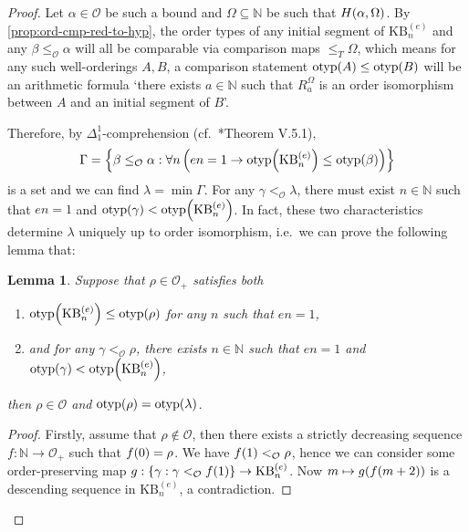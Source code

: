 \documentclass[12pt,openany]{book}
\theoremstyle{plain}
\newtheorem*{lemma*}{Lemma}
\theoremstyle{definition}
\newcommand\uplabel[1]{\textup{(#1)}}
\newcommand\opA[1]{\mathop{\forall #1}}
\DeclareMathOperator\otyp{otyp}
\newcommand\KB{\mathrm{KB}}
\begin{document}
\begin{proof}
  Let $\alpha \in \mathcal{O}$ be such a bound and $\Omega \subseteq \mathbb{N}$ be such that $H\mleft(\alpha, \Omega\mright)$. By \autoref{prop:ord-cmp-red-to-hyp}, the order types of any initial segment of $\KB^{(e)}_n$ and any $\beta \leq_\mathcal{O} \alpha$ will all be comparable via comparison maps $\leq_T \Omega$, which means for any such well-orderings $A, B$, a comparison statement $\otyp\mleft(A\mright) \leq \otyp\mleft(B\mright)$ will be an arithmetic formula `there exists $a \in \mathbb{N}$ such that $R^\Omega_a$ is an order isomorphism between $A$ and an initial segment of $B$'.

  Therefore, by $\Delta^1_1$-comprehension (cf.\ \cite{simpson09-soa}*{Theorem V.5.1}),
  \[\Gamma = \left\{\beta \leq_\mathcal{O} \alpha : \opA{n} \left(en = 1 \rightarrow \otyp\mleft(\KB^{(e)}_n\mright) \leq \otyp\mleft(\beta\mright)\right)\right\}\]
  is a set and we can find $\lambda = \min \Gamma$. For any $\gamma <_\mathcal{O} \lambda$, there must exist $n \in \mathbb{N}$ such that $en = 1$ and $\otyp\mleft(\gamma\mright) < \otyp\mleft(\KB^{(e)}_n\mright)$. In fact, these two characteristics determine $\lambda$ uniquely up to order isomorphism, i.e.\ we can prove the following lemma that:
  \begin{lemma*}
    Suppose that $\rho \in \mathcal{O}_+$ satisfies both
    \begin{enumerate}[label=\uplabel{\roman*}]
      \item $\otyp\mleft(\KB^{(e)}_n\mright) \leq \otyp\mleft(\rho\mright)$ for any $n$ such that $en = 1$,
      \item and for any $\gamma <_\mathcal{O} \rho$, there exists $n \in \mathbb{N}$ such that $en = 1$ and $\otyp\mleft(\gamma\mright) < \otyp\mleft(\KB^{(e)}_n\mright)$,
    \end{enumerate}
    then $\rho \in \mathcal{O}$ and $\otyp\mleft(\rho\mright) = \otyp\mleft(\lambda\mright)$.
  \end{lemma*}

  \begin{proof}
    Firstly, assume that $\rho \not\in \mathcal{O}$, then there exists a strictly decreasing sequence $f : \mathbb{N} \rightarrow \mathcal{O}_+$ such that $f\mleft(0\mright) = \rho$. We have $f\mleft(1\mright) <_\mathcal{O} \rho$, hence we can consider some order-preserving map $g : \left\{\gamma : \gamma <_\mathcal{O} f\mleft(1\mright)\right\} \rightarrow \KB^{(e)}_n$. Now $m \mapsto g\mleft(f\mleft(m + 2\mright)\mright)$ is a descending sequence in $\KB^{(e)}_n$, a contradiction.


\end{proof}
\end{proof}
\end{document}
